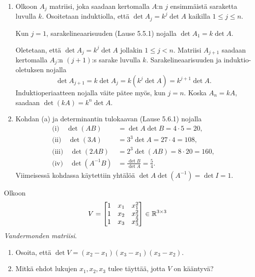 \documentclass[11pt,a4paper]{amsart}
\begin{document}
\begin{solution}
  \leavevmode\par
  \begin{enumerate}[label=(\alph*), leftmargin=*]
    \item Olkoon \(A_j\) matriisi, joka saadaan kertomalla \(A\):n
      \(j\) ensimmäistä saraketta luvulla \(k\). Osoitetaan
      induktiolla, että \(\det A_j=k^j\det A\) kaikilla
      \(1\le j\le n\).

      Kun \(j=1\), sarakelineaarisuuden (Lause 5.5.1) nojalla
      \(\det A_1=k\det A\).

      Oletetaan, että \(\det A_j=k^j\det A\) jollakin
      \(1\le j<n\). Matriisi \(A_{j+1}\) saadaan kertomalla
      \(A_j\):n \((j+1)\):s sarake luvulla \(k\). Sarakelineaarisuuden
      ja induktio-oletuksen nojalla
      \[
        \det A_{j+1}=k\det A_j=k(k^j\det A)=k^{j+1}\det A.
      \]
      Induktioperiaatteen nojalla väite pätee myös, kun \(j=n\).
      Koska \(A_n=kA\), saadaan \(\det(kA)=k^n\det A\).

    \item Kohdan (a) ja determinantin tulokaavan (Lause 5.6.1) nojalla
      \[
        \begin{aligned}
          \text{(i)}\quad \det(AB)
          &= \det A\det B=4\cdot 5=20, \\
          \text{(ii)}\quad \det(3A)
          &= 3^3\det A=27\cdot 4=108, \\
          \text{(iii)}\quad \det(2AB)
          &= 2^3\det(AB)=8\cdot 20=160, \\
          \text{(iv)}\quad \det(A^{-1}B)
          &= \frac{\det B}{\det A}=\frac54.
        \end{aligned}
      \]
      Viimeisessä kohdassa käytettiin yhtälöä
      \(\det A\det(A^{-1})=\det I=1\).
  \end{enumerate}
\end{solution}

\begin{exercise}
  Olkoon
  \[
    V=
    \begin{bmatrix}
      1 & x_1 & x_1^2 \\
      1 & x_2 & x_2^2 \\
      1 & x_3 & x_3^2
    \end{bmatrix}\in\mathbb{R}^{3\times 3}
  \]
  \emph{Vandermonden matriisi}.
  \begin{enumerate}[label=(\alph*), leftmargin=*]
    \item Osoita, että \(\det V=(x_2-x_1)(x_3-x_1)(x_3-x_2)\).
    \item Mitkä ehdot lukujen \(x_1,x_2,x_3\) tulee täyttää, jotta
      \(V\) on kääntyvä?
  \end{enumerate}
\end{exercise}
\end{document}
